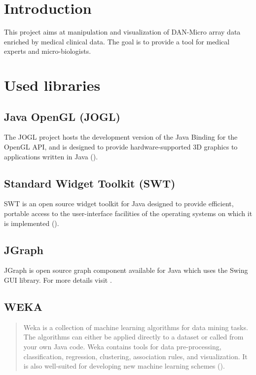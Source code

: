 \chapter{Introduction}

This project aims at manipulation and visualization of DAN-Micro array data enriched by medical clinical data. The goal is to provide a tool for medical experts and micro-biologists.

\chapter{Used libraries}

\section{Java OpenGL (JOGL)}

The JOGL project hosts the development version of the Java Binding for the OpenGL API, and is designed to provide hardware-supported 3D graphics to applications written in Java (\citep{jogl:06}).

\section{Standard Widget Toolkit (SWT)}

SWT is an open source widget toolkit for Java designed to provide efficient, portable access to the user-interface facilities of the operating systems on which it is implemented (\citep{swt:06}).

\section{JGraph}

JGraph is open source graph component available for Java which uses the Swing GUI library. For more details visit \citep{jgraph:06}. 

\section{WEKA}

\begin{quotation}
Weka is a collection of machine learning algorithms for data mining tasks. The algorithms can either be applied directly to a dataset or called from your own Java code. Weka contains tools for data pre-processing, classification, regression, clustering, association rules, and visualization. It is also well-suited for developing new machine learning schemes (\citep{weka:06}).
\end{quotation}

